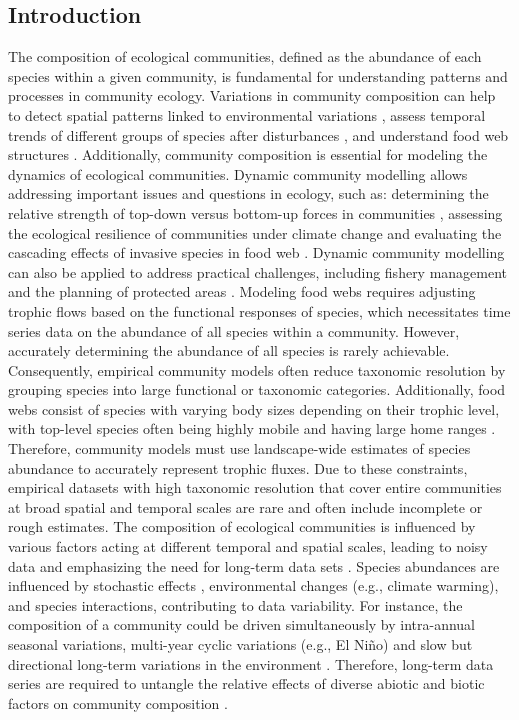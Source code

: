 \documentclass[a4paper,twoside,12pt]{article}
\begin{document}
\subsection*{Introduction}
 The composition of ecological communities, defined as the abundance of each species within a given community, is fundamental for understanding patterns and processes in community ecology. Variations in community composition can help to detect spatial patterns linked to environmental variations \citep{kemp1990}, assess temporal trends of different groups of species after disturbances \citep{philippi1998, magurran2007}, and understand food web structures \citep{cohen2003}. Additionally, community composition is essential for modeling the dynamics of ecological communities. Dynamic community modelling allows addressing important issues and questions in ecology, such as: determining the relative strength of top-down versus bottom-up forces in communities \citep{krebs2003,legagneux2014}, assessing the ecological resilience of communities under climate change \citep{griffith2019} and evaluating the cascading effects of invasive species in food web \citep{david2017, goto2020}. Dynamic community modelling can also be applied to address practical challenges, including fishery management \citep{plaganyi2007} and the planning of protected areas \citep{okey2004, dahood2020}. 
Modeling food webs requires adjusting trophic flows based on the functional responses of species, which necessitates time series data on the abundance of all species within a community. However, accurately determining the abundance of all species is rarely achievable. Consequently, empirical community models often reduce taxonomic resolution by grouping species into large functional or taxonomic categories. Additionally, food webs consist of species with varying body sizes depending on their trophic level, with top-level species often being highly mobile and having large home ranges \citep{mccann2005}. Therefore, community models must use landscape-wide estimates of species abundance to accurately represent trophic fluxes. Due to these constraints, empirical datasets with high taxonomic resolution that cover entire communities at broad spatial and temporal scales are rare and often include incomplete or rough estimates.
The composition of ecological communities is influenced by various factors acting at different temporal and spatial scales, leading to noisy data and emphasizing the need for long-term data sets \citep{magurran2010, lindenmayer2012}. Species abundances are influenced by stochastic effects \citep{hubbell2001}, environmental changes (e.g., climate warming), and species interactions, contributing to data variability. For instance, the composition of a community could be driven simultaneously by intra-annual seasonal variations, multi-year cyclic variations (e.g., El Niño) and slow but directional long-term variations in the environment \citep{brown1990, snyder2006}. Therefore, long-term data series are required to untangle the relative effects of diverse abiotic and biotic factors on community composition \citep{magurran2010, lindenmayer2012}.
\end{document}

